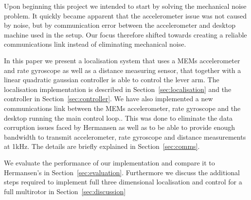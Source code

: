 Upon beginning this project we intended to start by solving the mechanical noise problem. It quickly became apparent that the 
accelerometer issue was not caused by noise, but by communication error between the accelerometer and desktop machine used in the setup.
Our focus therefore shifted towards creating a reliable communications link instead of eliminating mechanical noise.

In this paper we present a localisation system that uses a MEMs accelerometer and rate gyroscope as well as a distance measuring sensor,
that together with a linear quadratic gaussian controller is able to control the lever arm. The localisation implementation is described
in Section~\ref{sec:localisation} and the controller in Section~\ref{sec:controller}.
We have also implemented a new communications 
link between the MEMs accelerometer, rate gyroscope and the desktop running the main control loop.. This was done to eliminate the data corruption 
issues faced by Hermansen as well as to be able to provide enough bandwidth to transmit accelerometer, rate gyroscope and distance 
measurements at 1kHz. The details are briefly explained in Section~\ref{sec:comms}. 

We evaluate the performance of our implementation and compare it to Hermansen's in Section~\ref{sec:evaluation}. Furthermore we 
discuss the additional steps required to implement full three dimensional localisation and control for a full multirotor in Section~\ref{sec:discussion}


